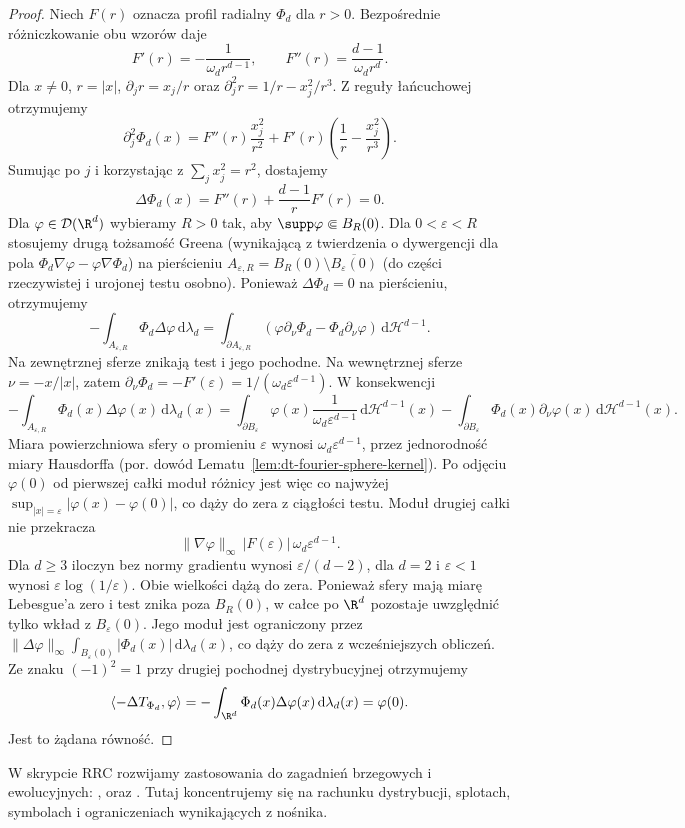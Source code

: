 \begin{proof}
Niech $F(r)$ oznacza profil radialny $\Phi_d$ dla $r>0$.
Bezpośrednie różniczkowanie obu wzorów daje
\[
 F'(r)=-\frac1{\omega_dr^{d-1}},\qquad
 F''(r)=\frac{d-1}{\omega_dr^d}.
\]
Dla $x\ne0$, $r=|x|$,
$\partial_jr=x_j/r$ oraz
$\partial_j^2r=1/r-x_j^2/r^3$.
Z reguły łańcuchowej otrzymujemy
\[
 \partial_j^2\Phi_d(x)
 =F''(r)\frac{x_j^2}{r^2}
 +F'(r)\left(\frac1r-\frac{x_j^2}{r^3}\right).
\]
Sumując po $j$ i korzystając z $\sum_j x_j^2=r^2$,
dostajemy
\[
 \Delta\Phi_d(x)
 =F''(r)+\frac{d-1}{r}F'(r)=0.
\]
Dla $\varphi\in\mathcal D(\R^d)$ wybieramy $R>0$
tak, aby $\supp\varphi\Subset B_R(0)$.
Dla $0<\varepsilon<R$ stosujemy drugą tożsamość
Greena (wynikającą z twierdzenia o dywergencji
dla pola $\Phi_d\nabla\varphi-\varphi\nabla\Phi_d$) na pierścieniu
$A_{\varepsilon,R}=B_R(0)\setminus\overline{B_\varepsilon(0)}$
(do części rzeczywistej i urojonej testu osobno).
Ponieważ $\Delta\Phi_d=0$ na pierścieniu,
otrzymujemy
\[
 -\int_{A_{\varepsilon,R}}\Phi_d\Delta\varphi
 \,\mathrm d\lambda_d
 =\int_{\partial A_{\varepsilon,R}}
 (\varphi\partial_\nu\Phi_d-\Phi_d\partial_\nu\varphi)
 \,\mathrm d\mathcal H^{d-1}.
\]
Na zewnętrznej sferze znikają test i jego pochodne.
Na wewnętrznej sferze $\nu=-x/|x|$, zatem
$\partial_\nu\Phi_d=-F'(\varepsilon)
=1/(\omega_d\varepsilon^{d-1})$.
W konsekwencji
\[
 -\int_{A_{\varepsilon,R}}\Phi_d(x)\Delta\varphi(x)
 \,\mathrm d\lambda_d(x)
 =\int_{\partial B_\varepsilon}\varphi(x)
 \frac{1}{\omega_d\varepsilon^{d-1}}\,\mathrm d\mathcal H^{d-1}(x)
 -\int_{\partial B_\varepsilon}\Phi_d(x)
 \partial_\nu\varphi(x)\,\mathrm d\mathcal H^{d-1}(x).
\]
Miara powierzchniowa sfery o promieniu $\varepsilon$
wynosi $\omega_d\varepsilon^{d-1}$, przez jednorodność
miary Hausdorffa (por. dowód Lematu~\ref{lem:dt-fourier-sphere-kernel}). Po odjęciu
$\varphi(0)$ od pierwszej całki moduł różnicy
jest więc co najwyżej
$\sup_{|x|=\varepsilon}|\varphi(x)-\varphi(0)|$,
co dąży do zera z ciągłości testu.
Moduł drugiej całki nie przekracza
\[
 \|\nabla\varphi\|_\infty\,
 |F(\varepsilon)|\,\omega_d\varepsilon^{d-1}.
\]
Dla $d\ge3$ iloczyn bez normy gradientu wynosi
$\varepsilon/(d-2)$, dla $d=2$ i $\varepsilon<1$
wynosi $\varepsilon\log(1/\varepsilon)$.
Obie wielkości dążą do zera.
Ponieważ sfery mają miarę Lebesgue'a zero
i test znika poza $B_R(0)$, w całce po $\R^d$
pozostaje uwzględnić tylko wkład z $B_\varepsilon(0)$.
Jego moduł jest ograniczony przez
$\|\Delta\varphi\|_\infty
\int_{B_\varepsilon(0)}|\Phi_d(x)|\,\mathrm d\lambda_d(x)$,
co dąży do zera z wcześniejszych obliczeń.
Ze znaku $(-1)^2=1$ przy drugiej pochodnej
dystrybucyjnej otrzymujemy
\[
 \langle-\Delta T_{\Phi_d},\varphi\rangle
 =-\int_{\R^d}\Phi_d(x)\Delta\varphi(x)
 \,\mathrm d\lambda_d(x)=\varphi(0).
\]
Jest to żądana równość.
\end{proof}

\begin{uwaga}
\noindent W skrypcie RRC rozwijamy zastosowania do
zagadnień brzegowych i ewolucyjnych:
,
oraz
.
Tutaj koncentrujemy się na rachunku dystrybucji,
splotach, symbolach i ograniczeniach wynikających
z nośnika.
\end{uwaga}
